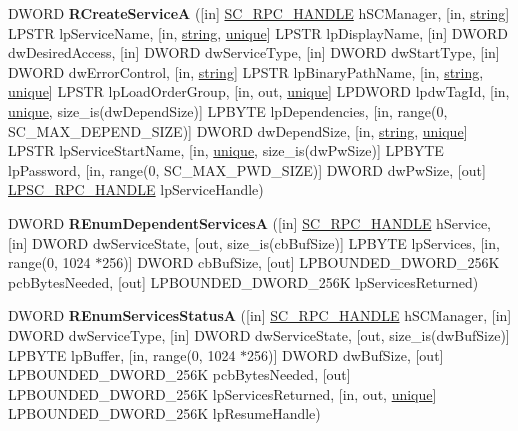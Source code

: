 \begin{DoxyCompactItemize}
D\+W\+O\+RD {\bfseries R\+Create\+ServiceA} (\mbox{[}in\mbox{]} \hyperlink{interfacevoid}{S\+C\+\_\+\+R\+P\+C\+\_\+\+H\+A\+N\+D\+LE} h\+S\+C\+Manager, \mbox{[}in, \hyperlink{structstring}{string}\mbox{]} L\+P\+S\+TR lp\+Service\+Name, \mbox{[}in, \hyperlink{structstring}{string}, \hyperlink{interfaceunique}{unique}\mbox{]} L\+P\+S\+TR lp\+Display\+Name, \mbox{[}in\mbox{]} D\+W\+O\+RD dw\+Desired\+Access, \mbox{[}in\mbox{]} D\+W\+O\+RD dw\+Service\+Type, \mbox{[}in\mbox{]} D\+W\+O\+RD dw\+Start\+Type, \mbox{[}in\mbox{]} D\+W\+O\+RD dw\+Error\+Control, \mbox{[}in, \hyperlink{structstring}{string}\mbox{]} L\+P\+S\+TR lp\+Binary\+Path\+Name, \mbox{[}in, \hyperlink{structstring}{string}, \hyperlink{interfaceunique}{unique}\mbox{]} L\+P\+S\+TR lp\+Load\+Order\+Group, \mbox{[}in, out, \hyperlink{interfaceunique}{unique}\mbox{]} L\+P\+D\+W\+O\+RD lpdw\+Tag\+Id, \mbox{[}in, \hyperlink{interfaceunique}{unique}, size\+\_\+is(dw\+Depend\+Size)\mbox{]} L\+P\+B\+Y\+TE lp\+Dependencies, \mbox{[}in, range(0, S\+C\+\_\+\+M\+A\+X\+\_\+\+D\+E\+P\+E\+N\+D\+\_\+\+S\+I\+ZE)\mbox{]} D\+W\+O\+RD dw\+Depend\+Size, \mbox{[}in, \hyperlink{structstring}{string}, \hyperlink{interfaceunique}{unique}\mbox{]} L\+P\+S\+TR lp\+Service\+Start\+Name, \mbox{[}in, \hyperlink{interfaceunique}{unique}, size\+\_\+is(dw\+Pw\+Size)\mbox{]} L\+P\+B\+Y\+TE lp\+Password, \mbox{[}in, range(0, S\+C\+\_\+\+M\+A\+X\+\_\+\+P\+W\+D\+\_\+\+S\+I\+ZE)\mbox{]} D\+W\+O\+RD dw\+Pw\+Size, \mbox{[}out\mbox{]} \hyperlink{interfacevoid}{L\+P\+S\+C\+\_\+\+R\+P\+C\+\_\+\+H\+A\+N\+D\+LE} lp\+Service\+Handle)
\item 
\mbox{\label{interfacesvcctl_a25ed91d30e3dbb6c0df8475b1697ac95}} 
D\+W\+O\+RD {\bfseries R\+Enum\+Dependent\+ServicesA} (\mbox{[}in\mbox{]} \hyperlink{interfacevoid}{S\+C\+\_\+\+R\+P\+C\+\_\+\+H\+A\+N\+D\+LE} h\+Service, \mbox{[}in\mbox{]} D\+W\+O\+RD dw\+Service\+State, \mbox{[}out, size\+\_\+is(cb\+Buf\+Size)\mbox{]} L\+P\+B\+Y\+TE lp\+Services, \mbox{[}in, range(0, 1024 $\ast$256)\mbox{]} D\+W\+O\+RD cb\+Buf\+Size, \mbox{[}out\mbox{]} L\+P\+B\+O\+U\+N\+D\+E\+D\+\_\+\+D\+W\+O\+R\+D\+\_\+256K pcb\+Bytes\+Needed, \mbox{[}out\mbox{]} L\+P\+B\+O\+U\+N\+D\+E\+D\+\_\+\+D\+W\+O\+R\+D\+\_\+256K lp\+Services\+Returned)
\item 
\mbox{\label{interfacesvcctl_a564078256f69847553d6f79fdf004ec1}} 
D\+W\+O\+RD {\bfseries R\+Enum\+Services\+StatusA} (\mbox{[}in\mbox{]} \hyperlink{interfacevoid}{S\+C\+\_\+\+R\+P\+C\+\_\+\+H\+A\+N\+D\+LE} h\+S\+C\+Manager, \mbox{[}in\mbox{]} D\+W\+O\+RD dw\+Service\+Type, \mbox{[}in\mbox{]} D\+W\+O\+RD dw\+Service\+State, \mbox{[}out, size\+\_\+is(dw\+Buf\+Size)\mbox{]} L\+P\+B\+Y\+TE lp\+Buffer, \mbox{[}in, range(0, 1024 $\ast$256)\mbox{]} D\+W\+O\+RD dw\+Buf\+Size, \mbox{[}out\mbox{]} L\+P\+B\+O\+U\+N\+D\+E\+D\+\_\+\+D\+W\+O\+R\+D\+\_\+256K pcb\+Bytes\+Needed, \mbox{[}out\mbox{]} L\+P\+B\+O\+U\+N\+D\+E\+D\+\_\+\+D\+W\+O\+R\+D\+\_\+256K lp\+Services\+Returned, \mbox{[}in, out, \hyperlink{interfaceunique}{unique}\mbox{]} L\+P\+B\+O\+U\+N\+D\+E\+D\+\_\+\+D\+W\+O\+R\+D\+\_\+256K lp\+Resume\+Handle)

\end{DoxyCompactItemize}
